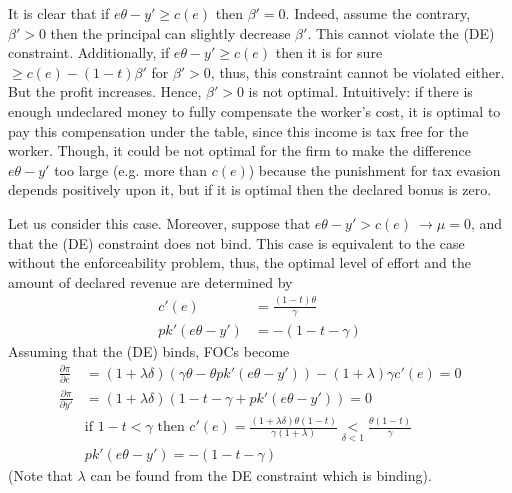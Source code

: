 \documentclass[a4paper]{article}
\begin{document}
It is clear that if $e \theta - y' \ge c(e)$ then $\beta' = 0$. Indeed, assume the contrary, $\beta' > 0$ then the principal can slightly decrease $\beta'$. This cannot violate the (DE) constraint. Additionally, if $e\theta - y' \ge c(e)$ then it is for sure $\ge c(e) - (1 - t)\beta'$ for $\beta'>0$, thus, this constraint cannot be violated either. But the profit increases. Hence, $\beta'>0$ is not optimal. Intuitively: if there is enough undeclared money to fully compensate the worker's cost, it is optimal to pay this compensation under the table, since this income is tax free for the worker. Though, it could be not optimal for the firm to make the difference $e\theta - y'$ too large (e.g. more than $c(e)$) because the punishment for tax evasion depends positively upon it, but if it is optimal then the declared bonus is zero.


Let us consider this case. Moreover, suppose that $e \theta - y' > c(e)\ \to \mu = 0$, and that the (DE) constraint does not bind. This case is equivalent to the case without the enforceability problem, thus, the optimal level of effort and the amount of declared revenue are determined by
\begin{align*}
c'(e) &= \frac{(1 - t)\theta}{\gamma}\\
pk'(e\theta - y') &= - (1 - t - \gamma)
\end{align*}
Assuming that the (DE) binds, FOCs become
\begin{align*}
\frac{\partial \pi}{\partial e} &= (1 + \lambda \delta)(\gamma \theta - \theta p k'(e \theta - y')) -(1+ \lambda) \gamma c'(e)= 0\\
\frac{\partial \pi}{\partial y'} &= (1 + \lambda \delta)(1 - t - \gamma+pk'(e\theta - y')) = 0\\
&\text{if }1-t < \gamma \text{ then }c'(e) = \frac{(1+\lambda \delta)\theta(1-t)}{\gamma (1 + \lambda)} \underset{\delta < 1}{<} \frac{\theta(1-t)}{\gamma}\\
&pk'(e \theta - y') = -(1 - t - \gamma)
\end{align*}
(Note that $\lambda$ can be found from the DE constraint which is binding). 
\end{document}
